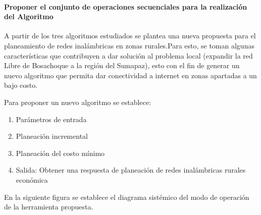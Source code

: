 \documentclass[]{article}
\providecommand{\tightlist}{%
  \setlength{\itemsep}{0pt}\setlength{\parskip}{0pt}}
\let\oldparagraph\paragraph
\renewcommand{\paragraph}[1]{\oldparagraph{#1}\mbox{}}
\begin{document}
\paragraph{Proponer el conjunto de operaciones secuenciales para la
realización del
Algoritmo}\label{proponer-el-conjunto-de-operaciones-secuenciales-para-la-realizaciuxf3n-del-algoritmo}

A partir de los tres algoritmos estudiados se plantea una nueva
propuesta para el planeamiento de redes inalámbricas en zonas
rurales.Para esto, se toman algunas características que contribuyen a
dar solución al problema local (expandir la red Libre de Bosachoque a la
región del Sumapaz), esto con el fin de generar un nuevo algoritmo que
permita dar conectividad a internet en zonas apartadas a un bajo costo.

Para proponer un nuevo algoritmo se establece:

\begin{enumerate}
\def\labelenumi{\arabic{enumi}.}
\tightlist
\item
  Parámetros de entrada
\item
  Planeación incremental
\item
  Planeación del costo mínimo
\item
  Salida: Obtener una respuesta de planeación de redes inalámbricas
  rurales económica
\end{enumerate}

En la siguiente figura se establece el diagrama sistémico del modo de
operación de la herramienta propuesta.
\end{document}
